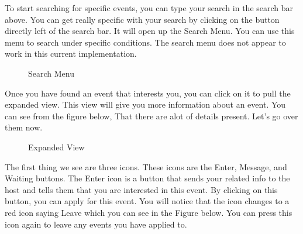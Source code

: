 \documentclass[10pt]{article}
\begin{document}
			To start searching for specific events, you can type your search in the search bar above. You can get really specific with your search by clicking on the button directly left of the search bar. It will open up the Search Menu. You can use this menu to search under specific conditions. The search menu does not appear to work in this current implementation.
			
			\begin{figure}[H]
				\centering
				\caption{Search Menu}
				\label{fig:awesome_image}
			\end{figure}
			
			Once you have found an event that interests you, you can click on it to pull the expanded view. This view will give you more information about an event. You can see from the figure below, That there are alot of details present. Let's go over them now.\par 
			
			\begin{figure}[H]
				\centering
				\caption{Expanded View}
				\label{fig:awesome_image}
			\end{figure}
			
			The first thing we see are three icons. These icons are the Enter, Message, and Waiting buttons. The Enter icon is a button that sends your related info to the host and tells them that you are interested in this event. By clicking on this button, you can apply for this event. You will notice that the icon changes to a red icon saying Leave which you can see in the Figure below. You can press this icon again to leave any events you have applied to.\par
			
\end{document}

